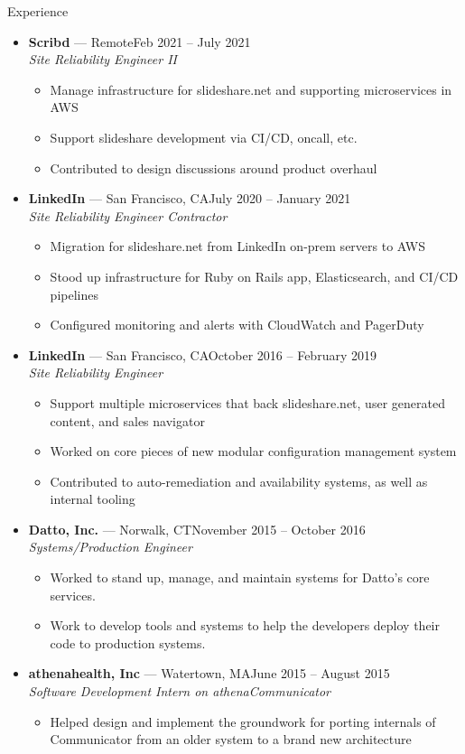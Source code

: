 \documentclass[10pt,oneside]{article}
\newenvironment{ressection}[1]{
	\vspace{2pt}
	{\fontfamily{bch}\selectfont\Large#1}
	\begin{itemize}
	\vspace{1pt}
}{
	\end{itemize}
}
\newcommand{\ressubitem}[1]{
	\vspace{-1pt}
	\item \begin{flushleft} #1 \end{flushleft}
}
\newcommand{\resbigitem}[3]{
	\vspace{-3pt}
	\item
	\textbf{#1} --- #2 \\
	\textit{#3}
}
\newenvironment{ressubsec}[3]{
	\resbigitem{#1}{#2}{#3}
	\vspace{-1pt}
	\begin{itemize}
}{
	\end{itemize}
}
\begin{document}
\begin{ressection}{Experience}

	\begin{ressubsec}{Scribd}{Remote\hfill Feb 2021 -- July 2021}{Site Reliability Engineer II}
		\ressubitem{Manage infrastructure for slideshare.net and supporting microservices in AWS}
		\ressubitem{Support slideshare development via CI/CD, oncall, etc.}
		\ressubitem{Contributed to design discussions around product overhaul}
	\end{ressubsec}
	\begin{ressubsec}{LinkedIn}{San Francisco, CA\hfill July 2020 -- January 2021}{Site Reliability Engineer Contractor}
		\ressubitem{Migration for slideshare.net from LinkedIn on-prem servers to AWS}
		\ressubitem{Stood up infrastructure for Ruby on Rails app, Elasticsearch, and CI/CD pipelines}
		\ressubitem{Configured monitoring and alerts with CloudWatch and PagerDuty}
	\end{ressubsec}
	\begin{ressubsec}{LinkedIn}{San Francisco, CA\hfill October 2016 -- February 2019}{Site Reliability Engineer}
		\ressubitem{Support multiple microservices that back slideshare.net, user generated content, and sales navigator}
		\ressubitem{Worked on core pieces of new modular configuration management system}
		\ressubitem{Contributed to auto-remediation and availability systems, as well as internal tooling}
	\end{ressubsec}
	\begin{ressubsec}{Datto, Inc.}{Norwalk, CT\hfill November 2015 -- October 2016}{Systems/Production Engineer}
		\ressubitem{Worked to stand up, manage, and maintain systems for Datto's core services.}
		\ressubitem{Work to develop tools and systems to help the developers deploy their code to production systems.}
	\end{ressubsec}
	\begin{ressubsec}{athenahealth, Inc}{Watertown, MA\hfill June 2015 -- August 2015}{Software Development Intern on athenaCommunicator}
		\ressubitem{Helped design and implement the groundwork for porting internals of Communicator from an older system to a brand new architecture}
	\end{ressubsec}

\end{ressection}
\end{document}
